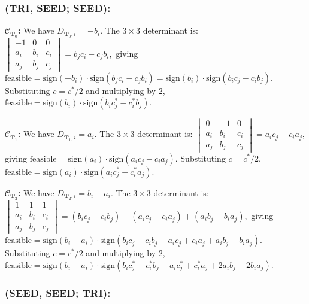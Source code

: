 \documentclass[12pt]{article}
\makeatletter
\theoremstyle{definition}
\theoremstyle{remark}
\renewenvironment{proof}[1][\proofname]{\par
  \pushQED{\qed}%
  \normalfont \footnotesize \topsep6\p@\@plus6\p@\relax
  \list{}{\leftmargin=2em
          \settowidth{\itemindent}{\itshape#1}%
          \labelwidth=\itemindent
          \parsep=0pt \listparindent=\parindent 
  }
  \item[\hskip\labelsep
        \itshape
    #1\@addpunct{.}]\ignorespaces
}{%
  \popQED\endlist\@endpefalse
}
\makeatother
\begin{document}
\begin{proof}
\subsubsection*{(TRI, SEED; SEED):}

\textbf{$\mathcal{C}_{\mathbf{T}_0}$:} We have $D_{\mathbf{T}_0,i} = -b_i$. The $3\times 3$ determinant is:
$
    \begin{vmatrix}
        -1  & 0   & 0   \\
        a_i & b_i & c_i \\
        a_j & b_j & c_j
    \end{vmatrix} = b_j c_i - c_j b_i,
    $
giving $\mathrm{feasible} = \mathrm{sign}(-b_i) \cdot \mathrm{sign}(b_j c_i - c_j b_i) = \mathrm{sign}(b_i) \cdot \mathrm{sign}(b_i c_j - c_i b_j)$.
Substituting $c = c^*/2$ and multiplying by $2$, $
    \mathrm{feasible} = \mathrm{sign}(b_i) \cdot \mathrm{sign}(b_i c_j^* - c_i^* b_j)$.

\noindent
\textbf{$\mathcal{C}_{\mathbf{T}_1}$:} We have $D_{\mathbf{T}_1,i} = a_i$. The $3\times 3$ determinant is:
$
    \begin{vmatrix}
        0   & -1  & 0   \\
        a_i & b_i & c_i \\
        a_j & b_j & c_j
    \end{vmatrix} = a_i c_j - c_i a_j,
$
giving $\mathrm{feasible} = \mathrm{sign}(a_i) \cdot \mathrm{sign}(a_i c_j - c_i a_j)$. Substituting $c = c^*/2$,
$
    \mathrm{feasible} = \mathrm{sign}(a_i) \cdot \mathrm{sign}(a_i c_j^* - c_i^* a_j).
$

\noindent
\textbf{$\mathcal{C}_{\mathbf{T}_2}$:} We have $D_{\mathbf{T}_2,i} = b_i - a_i$. The $3\times 3$ determinant is:
$
    \begin{vmatrix}
        1   & 1   & 1   \\
        a_i & b_i & c_i \\
        a_j & b_j & c_j
    \end{vmatrix} = (b_i c_j - c_i b_j) - (a_i c_j - c_i a_j) + (a_i b_j - b_i a_j),
$
giving $\mathrm{feasible} = \mathrm{sign}(b_i - a_i) \cdot \mathrm{sign}(b_i c_j - c_i b_j - a_i c_j + c_i a_j + a_i b_j - b_i a_j)$.
Substituting $c = c^*/2$ and multiplying by $2$,
$
    \mathrm{feasible} = \mathrm{sign}(b_i - a_i) \cdot \mathrm{sign}(b_i c_j^* - c_i^* b_j - a_i c_j^* + c_i^* a_j + 2a_i b_j - 2b_i a_j).
$

\subsubsection*{(SEED, SEED; TRI):}


\end{proof}
\end{document}
